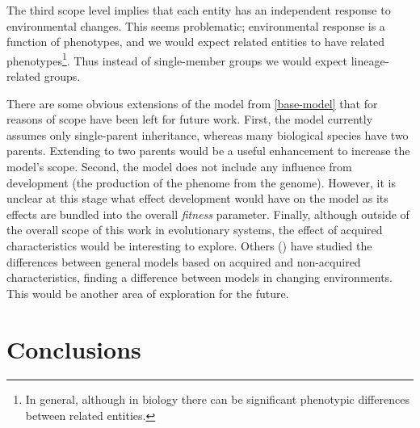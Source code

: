 The third scope level implies that each entity has an independent response to environmental changes. This seems problematic; environmental response is a function of phenotypes, and we would expect related entities to have related phenotypes\footnote{In general, although in biology there can be significant phenotypic differences between related entities.}. Thus instead of single-member groups we would expect lineage-related groups.

There are some obvious extensions of the model from \cref{base-model} that for reasons of scope have been left for future work. First, the model currently assumes only single-parent inheritance, whereas many biological species have two parents. Extending to two parents would be a useful enhancement to increase the model's scope. Second, the model does not include any influence from development (the production of the phenome from the genome). However, it is unclear at this stage what effect development would have on the model as its effects are bundled into the overall \emph{fitness} parameter. Finally, although outside of the overall scope of this work in evolutionary systems, the effect of acquired characteristics would be interesting to explore. Others (\eg \textcite{Gaucherel2012,Paenke:2007ie,Sasaki:2000dq}) have studied the differences between general models based on acquired and non-acquired characteristics, finding a difference between models in changing environments. This would be another area of exploration for the future.

\section{Conclusions}

